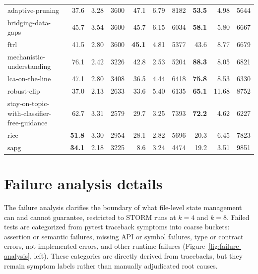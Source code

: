 \documentclass{article}
\begin{document}
\begin{table}[h]
{\begin{tabular}{l rrr rrr rrr}
    adaptive-pruning                                   & 37.6 & 3.28 & 3600 & 47.1 & 6.79 & 8182 & \textbf{53.5} & 4.98 & 5644 \\
    bridging-data-gaps                                 & 45.7 & 3.54 & 3600 & 45.7 & 6.15 & 6034 & \textbf{58.1} & 5.80 & 6667 \\
    ftrl                                               & 41.5 & 2.80 & 3600 & \textbf{45.1} & 4.81 & 5377 & 43.6 & 8.77 & 6679 \\
    mechanistic-understanding                          & 76.1 & 2.42 & 3226 & 42.8 & 2.53 & 5204 & \textbf{88.3} & 8.05 & 6821 \\
    lca-on-the-line                                    & 47.1 & 2.80 & 3408 & 36.5 & 4.44 & 6418 & \textbf{75.8} & 8.53 & 6330 \\
    robust-clip                                        & 37.0 & 2.13 & 2633 & 33.6 & 5.40 & 6135 & \textbf{65.1} & 11.68 & 8752 \\
    stay-on-topic-with-classifier-free-guidance        & 62.7 & 3.31 & 2579 & 29.7 & 3.25 & 7393 & \textbf{72.2} & 4.62 & 6227 \\
    rice                                               & \textbf{51.8} & 3.30 & 2954 & 28.1 & 2.82 & 5696 & 20.3 & 6.45 & 7823 \\
    sapg                                               & \textbf{34.1} & 2.18 & 3225 & 8.6 & 3.24 & 4474 & 19.2 & 3.51 & 9851 \\
    \bottomrule
  \end{tabular}}
\end{table}


\section{Failure analysis details}
\label{app:analysis-failure-details}

The failure analysis clarifies the boundary of what file-level state management can and cannot guarantee, restricted to STORM runs at $k{=}4$ and $k{=}8$. Failed tests are categorized from pytest traceback symptoms into coarse buckets: assertion or semantic failures, missing API or symbol failures, type or contract errors, not-implemented errors, and other runtime failures (Figure~\ref{fig:failure-analysis}, left). These categories are directly derived from tracebacks, but they remain symptom labels rather than manually adjudicated root causes.
\end{document}
